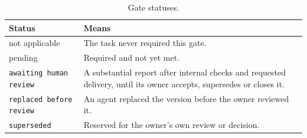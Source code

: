 \begin{table}[H]
  \small
  \begin{tabularx}{\textwidth}{L{0.3\textwidth}Y}
    \toprule
    Status & Means \\
    \midrule
    not applicable & The task never required this gate. \\
    pending & Required and not yet met. \\
    \texttt{awaiting human review} & A substantial report after internal checks and requested
    delivery, until its owner accepts, supersedes or closes it. \\
    \texttt{replaced before review} & An agent replaced the version before the owner reviewed
    it. \\
    \texttt{superseded} & Reserved for the owner's own review or decision. \\
    \bottomrule
  \end{tabularx}
  \caption{Gate statuses.}
  \label{tab:daily-status}
\end{table}
